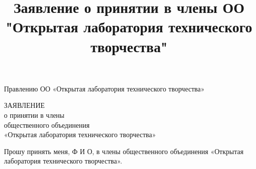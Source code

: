 \documentclass[a4paper,14pt,russian]{extarticle}
\title{Заявление о принятии в члены ОО "Открытая лаборатория технического творчества"}
\begin{document}
\pagestyle{empty}

{\addtolength{\leftskip}{11 cm}
\noindent
Правлению ОО «Открытая лаборатория технического творчества»

}

\vspace{2.0cm}

\begin{center}
ЗАЯВЛЕНИЕ\\о принятии в члены\\
общественного объединения\\
«Открытая лаборатория технического творчества»
\end{center}

Прошу принять меня, Ф И О, в члены общественного объединения
«Открытая лаборатория технического творчества».
\end{document}
